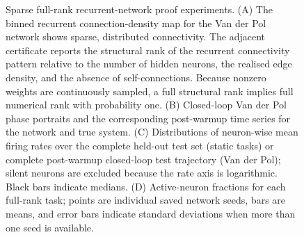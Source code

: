 \begin{figure}[t]
    \centering
    
    \caption{Sparse full-rank recurrent-network proof experiments. (A) The binned recurrent connection-density map for the Van der Pol network shows sparse, distributed connectivity. The adjacent certificate reports the structural rank of the recurrent connectivity pattern relative to the number of hidden neurons, the realised edge density, and the absence of self-connections. Because nonzero weights are continuously sampled, a full structural rank implies full numerical rank with probability one. (B) Closed-loop Van der Pol phase portraits and the corresponding post-warmup time series for the network and true system. (C) Distributions of neuron-wise mean firing rates over the complete held-out test set (static tasks) or complete post-warmup closed-loop test trajectory (Van der Pol); silent neurons are excluded because the rate axis is logarithmic. Black bars indicate medians. (D) Active-neuron fractions for each full-rank task; points are individual saved network seeds, bars are means, and error bars indicate standard deviations when more than one seed is available.}
    \label{fig:full-rank-proof-networks}
\end{figure}
